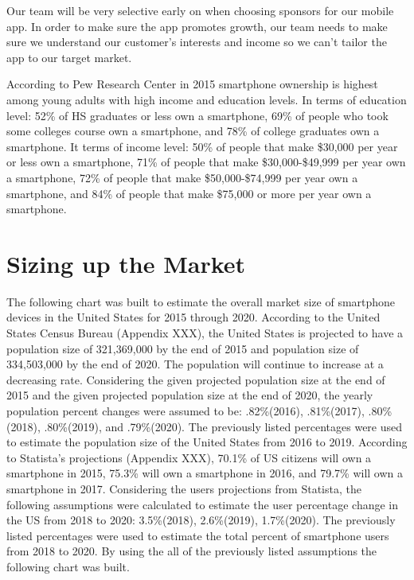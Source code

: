 Our team will be very selective early on when choosing sponsors for our mobile app. In order to make sure the app promotes growth, our team needs to make sure we understand our customer’s interests and income so we can’t tailor the app to our target market.

According to Pew Research Center in 2015 smartphone ownership is highest among young adults with high income and education levels. In terms of education level: 52\% of HS graduates or less own a smartphone, 69\% of people who took some colleges course own a smartphone, and 78\% of college graduates own a smartphone. It terms of income level: 50\% of people that make \$30,000 per year or less own a smartphone, 71\% of people that make \$30,000-\$49,999 per year own a smartphone, 72\% of people that make \$50,000-\$74,999 per year own a smartphone, and 84\% of people that make \$75,000 or more per year own a smartphone.


\section{Sizing up the Market}

The following chart was built to estimate the overall market size of smartphone devices in the United States for 2015 through 2020. According to the United States Census Bureau (Appendix XXX), the United States is projected to have a population size of 321,369,000 by the end of 2015 and population size of 334,503,000 by the end of 2020. The population will continue to increase at a decreasing rate. Considering the given projected population size at the end of 2015 and the given projected population size at the end of 2020, the yearly population percent changes were assumed to be: .82\%(2016), .81\%(2017), .80\%(2018), .80\%(2019), and .79\%(2020). The previously listed percentages were used to estimate the population size of the United States from 2016 to 2019. According to Statista’s projections (Appendix XXX), 70.1\% of US citizens will own a smartphone in 2015, 75.3\% will own a smartphone in 2016, and 79.7\% will own a smartphone in 2017. Considering the users projections from Statista, the following assumptions were calculated to estimate the user percentage change in the US from 2018 to 2020: 3.5\%(2018), 2.6\%(2019), 1.7\%(2020). The previously listed percentages were used to estimate the total percent of smartphone users from 2018 to 2020. By using the all of the previously listed assumptions the following chart was built. 



